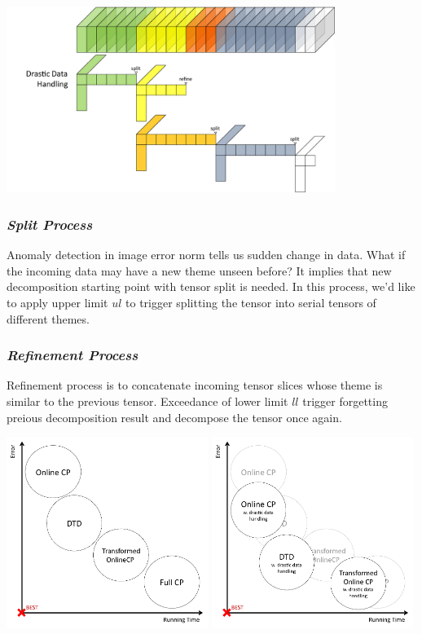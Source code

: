 \begin{center}
	\includegraphics[width=0.8\textwidth]{FIG/0-drastic-data-handling.pdf}
\end{center}

\subsubsection{\em Split Process}
Anomaly detection in image error norm tells us sudden change in data. What if the incoming data may have a new theme unseen before? It implies that new decomposition starting point with tensor split is needed. In this process, we'd like to apply upper limit ${ul}$ to trigger splitting the tensor into serial tensors of different themes.

\subsubsection{\em Refinement Process}
Refinement process is to concatenate incoming tensor slices whose theme is similar to the previous tensor. Exceedance of lower limit ${ll}$ trigger forgetting preious decomposition result and decompose the tensor once again.

\begin{center}
	\includegraphics[width=0.49\textwidth]{FIG/1-online-tensor-decomposition.pdf}
	\includegraphics[width=0.49\textwidth]{FIG/1-drastic-data-handling.pdf}
\end{center}
